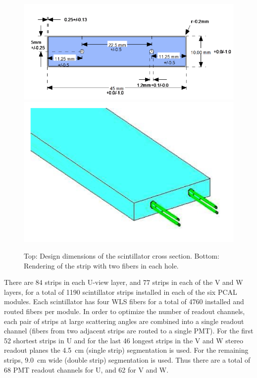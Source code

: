 \begin{figure}[hbt]
\centering
\includegraphics[width=1.05\columnwidth,keepaspectratio]{img/S3_4a.png}
\includegraphics[width=0.75\columnwidth,keepaspectratio]{img/S3_4b.png}
\caption[PCAL UVW Layers]{Top: Design dimensions of the scintillator cross section. Bottom: Rendering of the
  strip with two fibers in each hole.}
\label{fig:S3_4}
\end{figure}

There are $84$ strips in each U-view layer, and $77$ strips in each of the V and W layers, for a total of 1190 scintillator strips installed in each of the six PCAL modules. Each scintillator has four WLS fibers for a total of 4760 installed and routed fibers per module. In order to optimize the number of
readout channels, each pair of strips at large scattering angles are combined into a single readout channel (fibers
from two adjacent strips are routed to a single PMT). For the first 52 shortest strips in U and for the last 46
longest strips in the V and W stereo readout planes the 4.5~cm (single strip) segmentation is used. For the
remaining strips, 9.0~cm wide (double strip) segmentation is used. Thus there are a total of 68 PMT readout
channels for U, and 62 for V and W.
